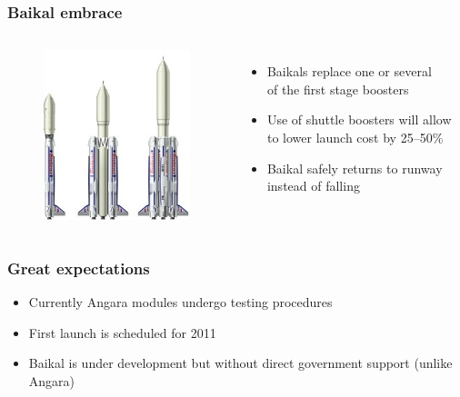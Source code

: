 \documentclass[onlymath]{beamer}
\newcommand\tw\textwidth
\begin{document}
\begin{frame}
  \frametitle{Baikal embrace}
  \begin{columns}
    \column{.5\tw}
    \begin{figure}
      \centering
      \includegraphics[scale=0.5]{Baikal-Angara.jpg}
    \end{figure}
    \column{.5\tw}
    \begin{itemize}
    \item Baikals replace one or several \\of the first stage boosters
    \item Use of shuttle boosters will allow to lower launch cost by
      25--50\%
    \item Baikal safely returns to runway instead of falling
    \end{itemize}
  \end{columns}

\end{frame}

\begin{frame}
  \frametitle{Great expectations}
  \begin{itemize}
  \item Currently Angara modules undergo testing procedures
  \item First launch is scheduled for 2011
  \item Baikal is under development but without direct government
    support (unlike Angara)
  \end{itemize}
\end{frame}
\end{document}
